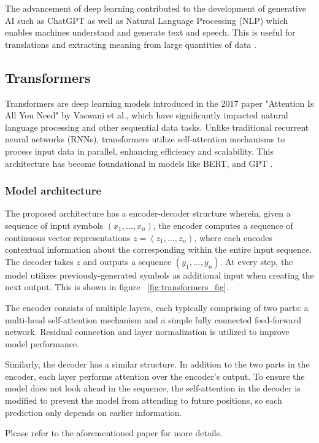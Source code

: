 \documentclass[licencjacka,en]{pracamgr}
\begin{document}
The advancement of deep learning contributed to the development of generative AI such as ChatGPT as well as Natural Language Processing (NLP) which enables machines understand and generate text and speech. This is useful for translations and extracting meaning from large quantities of data \cite{ibm_dl}.

\subsection{Transformers}
Transformers are deep learning models introduced in the 2017 paper "Attention Is All You Need" \cite{attention} by Vaswani et al., which have significantly impacted natural language processing and other sequential data tasks. Unlike traditional recurrent neural networks (RNNs), transformers utilize self-attention mechanisms to process input data in parallel, enhancing efficiency and scalability. This architecture has become foundational in models like BERT, and GPT \cite{medium_t}.

\subsubsection{Model architecture}
The proposed architecture has a encoder-decoder structure wherein, given a sequence of input symbols $ (x_1, … , x_n) $, the encoder computes a sequence of continuous vector representations $ z = (z_1, … , z_n) $, where each encodes contextual information about the corresponding within the entire input sequence. The decoder takes $ z $ and outputs a sequence $ (y_1, … , y_n) $. At every step, the model utilizes previously-generated symbols as additional input when creating the next output. This is shown in figure ~\ref{fig:transformers_fig}.

The encoder consists of multiple layers, each typically comprising of two parts: a multi-head self-attention mechanism and a simple fully connected feed-forward network. Residual connection and layer normalization is utilized to improve model performance.

Similarly, the decoder has a similar structure. In addition to the two parts in the encoder, each layer performs attention over the encoder’s output. To ensure the model does not look ahead in the sequence, the self-attention in the decoder is modified to prevent the model from attending to future positions, so each prediction only depends on earlier information.

Please refer to the aforementioned paper for more details.
\end{document}
